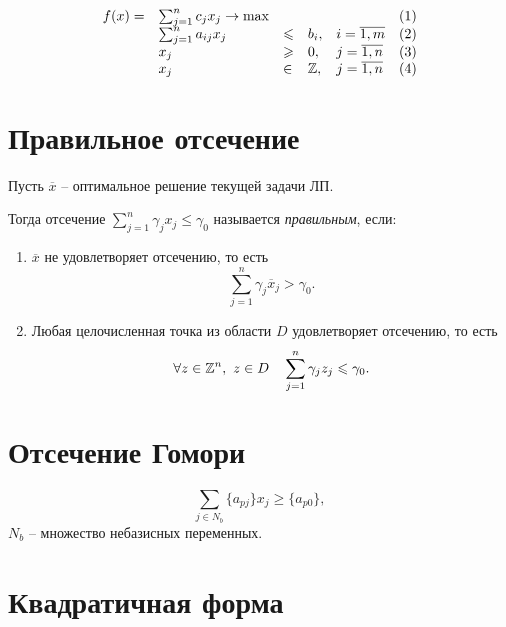 \[
	\begin{array}{lllllr}
		f(x) = & \sum_{j=1}^{n}c_jx_j \rightarrow \max &           &      &                    & (1) \\
		       & \sum_{j=1}^{n}a_{ij}x_j               & \leqslant & b_i, & i = \overline{1,m} & (2) \\
		       & x_j                                   & \geqslant & 0,   & j = \overline{1,n} & (3) \\
		       & x_j                                   & \in       & \mathbb{Z},  & j = \overline{1,n} & (4)
	\end{array}
\]

\section{Правильное отсечение}

\begin{definition}
	Пусть $\overline{x}$ -- оптимальное решение текущей задачи ЛП.

	Тогда отсечение $\sum_{j=1}^{n} \gamma_j x_j \leqslant \gamma_0$ называется \emph{правильным}, если:
	\begin{enumerate}
		\item $\overline{x}$ не удовлетворяет отсечению, то есть
		      \[
			      \sum_{j=1}^{n} \gamma_j \overline{x}_j > \gamma_0.
		      \]
		\item Любая целочисленная точка из области $D$ удовлетворяет отсечению, то есть
		      \[
			      \forall z \in \mathbb{Z}^n, \ z \in D \quad \sum_{j=1}^{n} \gamma_j z_j \leqslant \gamma_0.
		      \]
	\end{enumerate}
\end{definition}

\newpage

\section{Отсечение Гомори}

\begin{definition}
	\[
		\sum_{j \in N_b} \{a_{pj}\}x_j \geqslant \{a_{p0}\},
	\]
	$N_b$ -- множество небазисных переменных.
\end{definition}

\section{Квадратичная форма}

